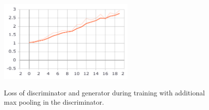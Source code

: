\begin{figure}[htbp]
	\begin{minipage}{0.8\textwidth}
		\centering
		\includegraphics[width=0.6\textwidth]{Sources/Results/pooling/plots_pdf/epoch_loss.pdf}
		\label{fig:3d}
	\end{minipage}
	
	\caption{Loss of discriminator and generator during training with additional max pooling in the discriminator.} \label{fig:3}
\end{figure}


